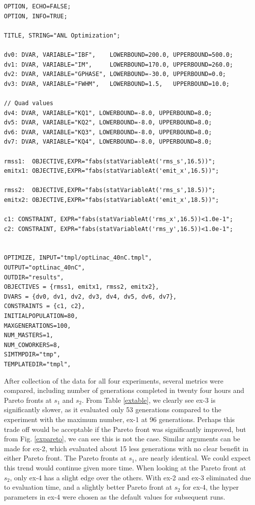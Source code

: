 \begin{Verbatim}[fontsize=\scriptsize]
OPTION, ECHO=FALSE;
OPTION, INFO=TRUE;

TITLE, STRING="ANL Optimization";

dv0: DVAR, VARIABLE="IBF",    LOWERBOUND=200.0, UPPERBOUND=500.0;
dv1: DVAR, VARIABLE="IM",     LOWERBOUND=170.0, UPPERBOUND=260.0;
dv2: DVAR, VARIABLE="GPHASE", LOWERBOUND=-30.0, UPPERBOUND=0.0;
dv3: DVAR, VARIABLE="FWHM",   LOWERBOUND=1.5,   UPPERBOUND=10.0;

// Quad values
dv4: DVAR, VARIABLE="KQ1", LOWERBOUND=-8.0, UPPERBOUND=8.0;
dv5: DVAR, VARIABLE="KQ2", LOWERBOUND=-8.0, UPPERBOUND=8.0;
dv6: DVAR, VARIABLE="KQ3", LOWERBOUND=-8.0, UPPERBOUND=8.0;
dv7: DVAR, VARIABLE="KQ4", LOWERBOUND=-8.0, UPPERBOUND=8.0;

rmss1:  OBJECTIVE,EXPR="fabs(statVariableAt('rms_s',16.5))";
emitx1: OBJECTIVE,EXPR="fabs(statVariableAt('emit_x',16.5))";

rmss2:  OBJECTIVE,EXPR="fabs(statVariableAt('rms_s',18.5))";
emitx2: OBJECTIVE,EXPR="fabs(statVariableAt('emit_x',18.5))";

c1: CONSTRAINT, EXPR="fabs(statVariableAt('rms_x',16.5))<1.0e-1";
c2: CONSTRAINT, EXPR="fabs(statVariableAt('rms_y',16.5))<1.0e-1";


OPTIMIZE, INPUT="tmpl/optLinac_40nC.tmpl",
OUTPUT="optLinac_40nC",
OUTDIR="results",
OBJECTIVES = {rmss1, emitx1, rmss2, emitx2},
DVARS = {dv0, dv1, dv2, dv3, dv4, dv5, dv6, dv7},
CONSTRAINTS = {c1, c2},
INITIALPOPULATION=80,
MAXGENERATIONS=100,
NUM_MASTERS=1,
NUM_COWORKERS=8,
SIMTMPDIR="tmp",
TEMPLATEDIR="tmpl",
\end{Verbatim}

After collection of the data for all four experiments, several metrics
were compared, including number of generations completed in twenty four hours and
Pareto fronts at $s_1$ and $s_2$.
From Table \ref{extable}, we clearly see ex-3 is significantly 
slower, as it evaluated only 53 generations 
compared to the experiment with the maximum number, ex-1 at 96 generations.
Perhaps this trade off would be acceptable if the Pareto front was significantly 
improved, but from Fig. \ref{expareto}, we can see this is not the case.
Similar arguments can be made for ex-2, which evaluated about 15 less generations
with no clear benefit in either Pareto front.
The Pareto fronts at $s_1$, are nearly identical. We could expect
this trend would continue given more time. 
When looking at the Pareto front at $s_2$, only ex-4 has a slight 
edge over the others.
With ex-2 and ex-3 eliminated due to evaluation time, 
and a slightly better Pareto front at $s_2$ for ex-4, the hyper parameters in ex-4 were chosen as the default values for subsequent runs.


